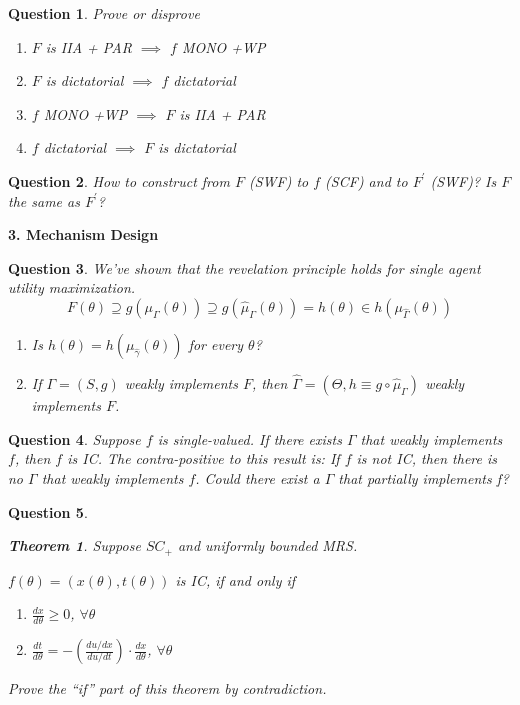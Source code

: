 \documentclass[11pt,leqno]{article}
\newtheorem{theorem}{Theorem}
\newtheorem{HW}{Question}
\begin{document}
\begin{HW} Prove or disprove
\begin{enumerate}
    \item $F$ is IIA + PAR $\implies$ $f$ MONO +WP
    \item $F$ is dictatorial $\implies$ $f$ dictatorial
    \item $f$ MONO +WP $\implies$ $F$ is IIA + PAR
    \item $f$ dictatorial $\implies$ $F$ is dictatorial
\end{enumerate}
\end{HW}

\begin{HW}
    How to construct from $F$ (SWF) to $f$ (SCF) and to $F^{\prime}$ (SWF)?
    Is $F$ the same as $F^{\prime}$?
\end{HW}

\textbf{3. Mechanism Design}

\begin{HW}
We've shown that the revelation principle holds for single agent utility maximization. $$F(\theta) \supseteq g\left(\mu_{\Gamma}(\theta)\right) \supseteq g\left(\hat{\mu}_{\Gamma}(\theta)\right)=h(\theta) \in h\left(\mu_{\hat{\Gamma}}(\theta)\right)$$ \begin{enumerate}
    \item Is $h(\theta)=h(\mu_{\hat{\gamma}}(\theta))$ for every $\theta$?
    \item If  $\Gamma=(S, g)$ weakly implements $F$, then $\hat{\Gamma}=\left(\Theta, h \equiv g \circ \hat{\mu}_{\Gamma}\right)$ weakly implements $F$.
\end{enumerate}
\end{HW}

\begin{HW}
    Suppose $f$ is single-valued. If there exists $\Gamma$ that weakly implements $f$, then $f$ is IC. The contra-positive to this result is: If $f$ is not IC, then there is no $\Gamma$ that weakly implements $f$. Could there exist a $\Gamma$ that partially implements f?
\end{HW}

\begin{HW}
    \begin{theorem}
Suppose $SC_{+}$ and uniformly bounded MRS.

$f(\theta)=\left(x(\theta),t(\theta)\right)$ is IC, if and only if 
\begin{enumerate}
    \item $\frac{d x}{d \theta}\geq 0$, $\forall \theta$\\
    \item $\frac{d t}{d \theta}=-\left(\frac{d u/d x}{d u/d t}\right)\cdot\frac{d x}{d \theta}$, $\forall \theta$
\end{enumerate}
\end{theorem}

Prove the ``if'' part of this theorem by contradiction.
\end{HW}
\end{document}
